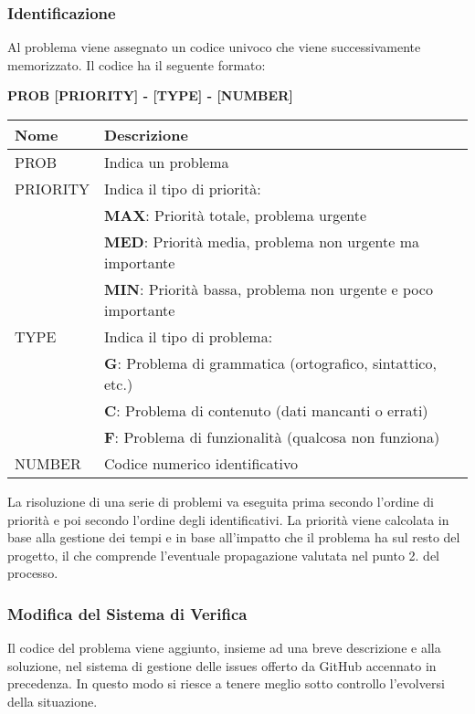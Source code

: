 \subsubsection{Identificazione}
Al problema viene assegnato un codice univoco che viene successivamente memorizzato. \newline 
Il codice ha il seguente formato: 
\begin{center}
    \textbf{PROB [PRIORITY] - [TYPE] - [NUMBER]}
\end{center}
\renewcommand{\arraystretch}{1.8} %
    \begin{tabular}{ |m{7em}|m{30em}| }
        \hline
        \textbf{Nome} & \textbf{Descrizione} \\
        \hline
            PROB & Indica un problema \\
        \hline
            PRIORITY 	& 	Indica il tipo di priorità: \\
                        &	\textbf{MAX}: Priorità totale, problema urgente \\
                        &	\textbf{MED}: Priorità media, problema non urgente ma importante \\
                        &	\textbf{MIN}: Priorità bassa, problema non urgente e poco importante \\
        \hline
                    
            TYPE 	& 	Indica il tipo di problema: \\
                    & 	\textbf{G}: Problema di grammatica (ortografico, sintattico, etc.) \\
                    &	\textbf{C}: Problema di contenuto (dati mancanti o errati) \\
                    &	\textbf{F}: Problema di funzionalità (qualcosa non funziona) \\
        \hline
            NUMBER & Codice numerico identificativo \\
        \hline
    \end{tabular} \newline \newline
La risoluzione di una serie di problemi va eseguita prima secondo l'ordine di priorità e poi secondo l'ordine degli identificativi. \newline 
La priorità viene calcolata in base alla gestione dei tempi e in base all'impatto che il problema ha sul resto del progetto, il che comprende l'eventuale propagazione valutata nel punto 2. del processo.
\subsubsection{Modifica del Sistema di Verifica}
Il codice del problema viene aggiunto, insieme ad una breve descrizione e alla soluzione, nel sistema di gestione delle issues offerto da GitHub accennato in precedenza.
In questo modo si riesce a tenere meglio sotto controllo l'evolversi della situazione.